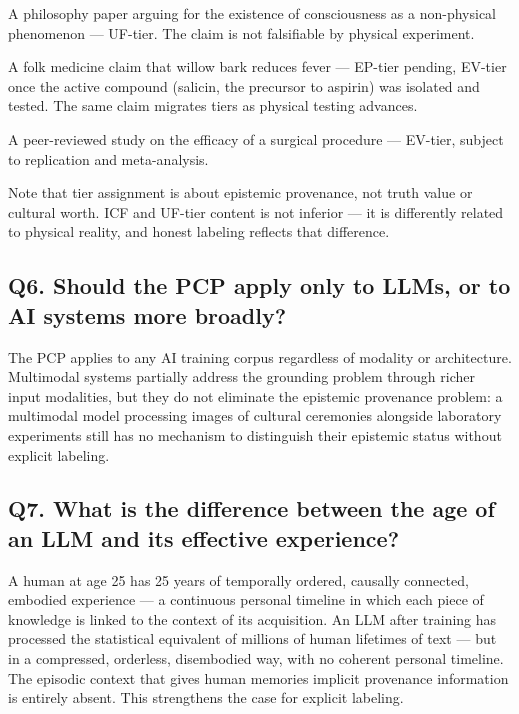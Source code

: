 \documentclass[
]{article}
\begin{document}
A philosophy paper arguing for the existence of consciousness as a
non-physical phenomenon --- UF-tier. The claim is not falsifiable by
physical experiment.

A folk medicine claim that willow bark reduces fever --- EP-tier
pending, EV-tier once the active compound (salicin, the precursor to
aspirin) was isolated and tested. The same claim migrates tiers as
physical testing advances.

A peer-reviewed study on the efficacy of a surgical procedure ---
EV-tier, subject to replication and meta-analysis.

Note that tier assignment is about epistemic provenance, not truth value
or cultural worth. ICF and UF-tier content is not inferior --- it is
differently related to physical reality, and honest labeling reflects
that difference.

\subsection{Q6. Should the PCP apply only to LLMs, or to AI systems more
broadly?}\label{q6.-should-the-pcp-apply-only-to-llms-or-to-ai-systems-more-broadly}

The PCP applies to any AI training corpus regardless of modality or
architecture. Multimodal systems partially address the grounding problem
through richer input modalities, but they do not eliminate the epistemic
provenance problem: a multimodal model processing images of cultural
ceremonies alongside laboratory experiments still has no mechanism to
distinguish their epistemic status without explicit labeling.

\subsection{Q7. What is the difference between the age of an LLM and its
effective
experience?}\label{q7.-what-is-the-difference-between-the-age-of-an-llm-and-its-effective-experience}

A human at age 25 has 25 years of temporally ordered, causally
connected, embodied experience --- a continuous personal timeline in
which each piece of knowledge is linked to the context of its
acquisition. An LLM after training has processed the statistical
equivalent of millions of human lifetimes of text --- but in a
compressed, orderless, disembodied way, with no coherent personal
timeline. The episodic context that gives human memories implicit
provenance information is entirely absent. This strengthens the case for
explicit labeling.
\end{document}
